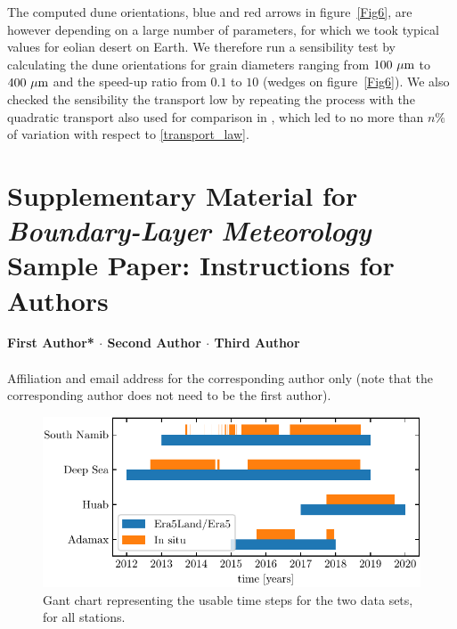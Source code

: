 The computed dune orientations, blue and red arrows in figure~\ref{Fig6}, are however depending on a large number of parameters, for which we took typical values for eolian desert on Earth. We therefore run a sensibility test by calculating the dune orientations for grain diameters ranging from $100~\mu\textup{m}$ to $400~\mu\textup{m}$ and the speed-up ratio from $0.1$ to $10$ (wedges on figure~\ref{Fig6}). We also checked the sensibility the transport low by repeating the process with the quadratic transport also used for comparison in \citet{Pahtz2020}, which led to no more than $n\%$ of variation with respect to \eqref{transport_law}.


\clearpage




\newpage
\renewcommand{\thefigure}{S\arabic{figure}}
\setcounter{figure}{0}

\section*{Supplementary Material for \textit{Boundary-Layer Meteorology} Sample Paper: Instructions for Authors}

{\textbf{First Author* $\cdot$ Second Author $\cdot$ Third Author \\}}
\\
\text{*}Affiliation and email address for the corresponding author only (note that the corresponding author does not need to be the first author).

\begin{figure}
  \centering
  \includegraphics[scale=1]{Figures/Figure1_supp.pdf}
  \caption{Gant chart representing the usable time steps for the two data sets, for all stations.}
  \label{Fig1_supp}
\end{figure}

